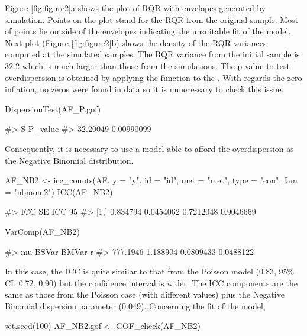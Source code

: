 Figure \ref{fig:figure2}a shows the plot of RQR with envelopes generated
by simulation. Points on the plot stand for the RQR from the original
sample. Most of points lie outside of the envelopes indicating the
unsuitable fit of the model. Next plot (Figure \ref{fig:figure2}b) shows
the density of the RQR variances computed at the simulated samples. The
RQR variance from the initial sample is 32.2 which is much larger than
those from the simulations. The p-value to test overdispersion is
obtained by applying the function  to the .
With regards the zero inflation, no zeros were found in data so it is
unnecessary to check this issue.

\begin{Schunk}
\begin{Sinput}
DispersionTest(AF_P.gof)
\end{Sinput}
\begin{Soutput}
#>         S    P_value
#>  32.20049 0.00990099
\end{Soutput}
\end{Schunk}

Consequently, it is necessary to use a model able to afford the
overdispersion as the Negative Binomial distribution.

\begin{Schunk}
\begin{Sinput}
AF_NB2 <- icc_counts(AF, y = "y", id = "id", met = "met", type = "con", fam = "nbinom2")
ICC(AF_NB2)
\end{Sinput}
\begin{Soutput}
#>           ICC    SE ICC 95% CI LL 95% CI UL
#> [1,] 0.834794 0.0454062 0.7212048 0.9046669
\end{Soutput}
\begin{Sinput}
VarComp(AF_NB2)
\end{Sinput}
\begin{Soutput}
#>        mu    BSVar     BMVar         r
#>  777.1946 1.188904 0.0809433 0.0488122
\end{Soutput}
\end{Schunk}

In this case, the ICC is quite similar to that from the Poisson model
(0.83, 95\% CI: 0.72, 0.90) but the confidence interval is wider. The
ICC components are the same as those from the Poisson case (with
different values) plus the Negative Binomial dispersion parameter
(0.049). Concerning the fit of the model,

\begin{Schunk}
\begin{Sinput}
set.seed(100)
AF_NB2.gof <- GOF_check(AF_NB2)
\end{Sinput}
\end{Schunk}

